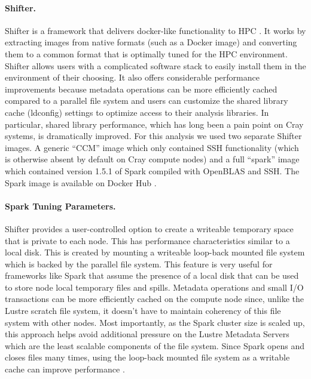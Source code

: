 \paragraph{Shifter.}
Shifter is a framework that delivers docker-like functionality to HPC \cite{shifter}. It works by extracting images from native formats (such as a Docker image) and converting them to a common format that is optimally tuned for the HPC environment. %
Shifter allows users with a complicated software stack to easily install them in the environment of their choosing. It also offers considerable performance improvements because metadata operations can be more efficiently cached compared to a parallel file system and users can customize the shared library cache (ldconfig) settings to optimize access to their analysis libraries. In particular, shared library performance, which has long been a pain point on Cray systems, is dramatically improved. For this analysis we used two separate Shifter images. A generic ``CCM'' image which only contained SSH functionality (which is otherwise absent by default on Cray compute nodes) and a full “spark” image which contained version 1.5.1 of Spark  compiled with OpenBLAS \cite{openblas} and SSH. The Spark image is available on Docker Hub \cite{dockerspark}. 

\paragraph{Spark Tuning Parameters.}
Shifter provides a user-controlled option to create a writeable temporary space that is private to each node. This has performance characteristics similar to a local disk. This is created by mounting a writeable loop-back mounted file system which is backed by the parallel file system. This feature is very useful for frameworks like Spark that assume the presence of a local disk that can be used to store node local temporary files and spills. Metadata operations and small I/O transactions can  be more efficiently cached on the compute node since, unlike the Lustre scratch file system, it doesn't have to maintain coherency of this file system with other nodes. Most importantly, as the Spark cluster size is scaled up, this approach helps avoid additional pressure on the Lustre Metadata Servers which are the least scalable components of the file system. Since Spark opens and closes files many times, using the loop-back mounted file system as a writable cache can improve performance \cite{scalingspark16}.

